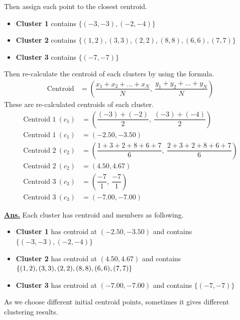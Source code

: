 \documentclass[12pt, a4paper]{article}
\newcommand{\ans}{\par\noindent\underline{\textbf{Ans.}} }
\begin{document}
\begin{enumerate}
            Then assign each point to the closest centroid.

            \begin{itemize}
                \item \textbf{Cluster 1} contains $\lbrace(-3, -3), (-2, -4)\rbrace$
                \item \textbf{Cluster 2} contains $\lbrace(1, 2), (3, 3), (2, 2), (8, 8), (6, 6), (7, 7)\rbrace$
                \item \textbf{Cluster 3} contains $\lbrace(-7, -7)\rbrace$
            \end{itemize}

            Then re-calculate the centroid of each clusters by using the formula.
            \begin{align*}
                \text{Centroid} & = \left( \dfrac{x_{1} + x_{2} + ... + x_{N}}{N}, \ \dfrac{y_{1} + y_{2} + ... + y_{N}}{N} \right)
            \end{align*}
            These are re-calculated centroids of each cluster.
            \begin{align*}
                \text{Centroid 1}\ (c_{1}) & = \left( \dfrac{(-3) + (-2)}{2},\ \dfrac{(-3) + (-4)}{2} \right) \\
                \text{Centroid 1}\ (c_{1}) & = (-2.50, -3.50) \\[0.75em]
                \text{Centroid 2}\ (c_{2}) & = \left( \dfrac{1 + 3 + 2 + 8 + 6 + 7}{6},\ \dfrac{2 + 3 + 2 + 8 + 6 + 7}{6} \right) \\
                \text{Centroid 2}\ (c_{2}) & = (4.50, 4.67) \\[0.75em]
                \text{Centroid 3}\ (c_{3}) & = \left( \dfrac{-7}{1},\ \dfrac{-7}{1} \right) \\
                \text{Centroid 3}\ (c_{3}) & = (-7.00, -7.00)
            \end{align*}
        \pagebreak

            \ans Each cluster has centroid and members as following.
            \begin{itemize}
                \item \textbf{Cluster 1} has centroid at $(-2.50, -3.50)$ and contains $\lbrace(-3, -3), (-2, -4)\rbrace$
                \item \textbf{Cluster 2} has centroid at $(4.50, 4.67)$ and contains $\lbrace(1, 2), (3, 3), (2, 2), \\ (8, 8), (6, 6), (7, 7)\rbrace$
                \item \textbf{Cluster 3} has centroid at $(-7.00, -7.00)$ and contains $\lbrace(-7, -7)\rbrace$
            \end{itemize}
            As we choose different initial centroid points, sometimes it gives different clustering results.
        \pagebreak


\end{enumerate}
\end{document}
